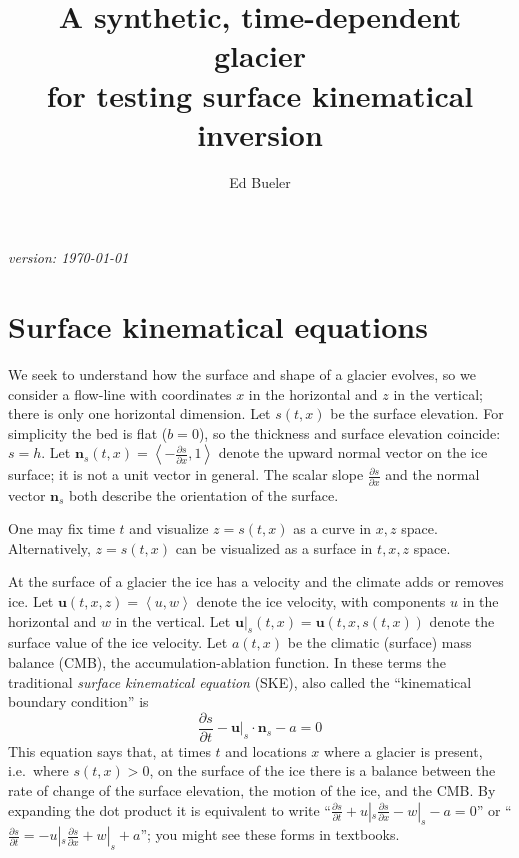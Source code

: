 \documentclass[letterpaper,final,12pt,reqno]{amsart}
\newcommand{\bn}{\mathbf{n}}
\newcommand{\bu}{\mathbf{u}}
\begin{document}

\title{A synthetic, time-dependent glacier \\ for testing surface kinematical inversion}

\author{Ed Bueler}

\maketitle

\begin{center}
{\footnotesize
\emph{version: \today}}
\end{center}

\thispagestyle{empty}

\section{Surface kinematical equations}  We seek to understand how the surface and shape of a glacier evolves, so we consider a flow-line with coordinates $x$ in the horizontal and $z$ in the vertical; there is only one horizontal dimension.  Let $s(t,x)$ be the surface elevation.  For simplicity the bed is flat ($b=0$), so the thickness and surface elevation coincide: $s=h$.  Let $\bn_s(t,x) = \left<-\frac{\partial s}{\partial x},1\right>$ denote the upward normal vector on the ice surface; it is not a unit vector in general.  The scalar slope $\frac{\partial s}{\partial x}$ and the normal vector $\bn_s$ both describe the orientation of the surface.

One may fix time $t$ and visualize $z=s(t,x)$ as a curve in $x,z$ space.  Alternatively, $z=s(t,x)$ can be visualized as a surface in $t,x,z$ space.

At the surface of a glacier the ice has a velocity and the climate adds or removes ice.  Let $\bu(t,x,z)=\left<u,w\right>$ denote the ice velocity, with components $u$ in the horizontal and $w$ in the vertical.  Let $\bu|_s(t,x) = \bu(t,x,s(t,x))$ denote the surface value of the ice velocity.  Let $a(t,x)$ be the climatic (surface) mass balance (CMB), the accumulation-ablation function.  In these terms the traditional \emph{surface kinematical equation} (SKE), also called the ``kinematical boundary condition'' \cite{FowlerNg2021,GreveBlatter2009} is
\begin{equation}
\frac{\partial s}{\partial t} - \bu|_s \cdot \bn_s - a = 0  \label{ske}
\end{equation}
This equation says that, at times $t$ and locations $x$ where a glacier is present, i.e.~where $s(t,x)>0$, on the surface of the ice there is a balance between the rate of change of the surface elevation, the motion of the ice, and the CMB.  By expanding the dot product it is equivalent to write ``$\frac{\partial s}{\partial t} + u|_s \frac{\partial s}{\partial x} - w|_s - a = 0$'' or ``$\frac{\partial s}{\partial t} = - u|_s \frac{\partial s}{\partial x} + w|_s + a$''; you might see these forms in textbooks.
\end{document}
